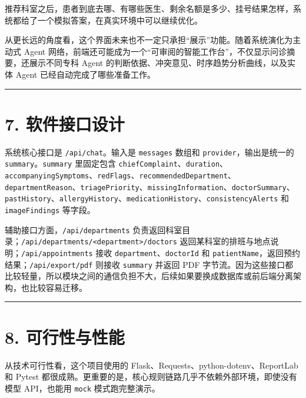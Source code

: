 \documentclass[
  chinese,
  12pt,
  UTF8,
  a4paper]{ctexart}
\begin{document}
推荐科室之后，患者到底去哪、有哪些医生、剩余名额是多少、挂号结果怎样，系统都给了一个模拟答案，在真实环境中可以继续优化。

从更长远的角度看，这个界面未来也不一定只承担``展示''功能。随着系统演化为主动式 Agent 网络，前端还可能成为一个``可审阅的智能工作台''，不仅显示问诊摘要，还展示不同专科 Agent 的判断依据、冲突意见、时序趋势分析曲线，以及实体 Agent 已经自动完成了哪些准备工作。

\begin{center}\rule{0.5\linewidth}{0.5pt}\end{center}

\section{7. 软件接口设计}\label{7-ux8f6fux4ef6ux63a5ux53e3ux8bbeux8ba1}

系统核心接口是 \texttt{/api/chat}。输入是 \texttt{messages} 数组和 \texttt{provider}，输出是统一的 \texttt{summary}。\texttt{summary} 里固定包含 \texttt{chiefComplaint}、\texttt{duration}、\texttt{accompanyingSymptoms}、\texttt{redFlags}、\texttt{recommendedDepartment}、\texttt{departmentReason}、\texttt{triagePriority}、\texttt{missingInformation}、\texttt{doctorSummary}、\texttt{pastHistory}、\texttt{allergyHistory}、\texttt{medicationHistory}、\texttt{consistencyAlerts} 和 \texttt{imageFindings} 等字段。

辅助接口方面，\texttt{/api/departments} 负责返回科室目录；\texttt{/api/departments/\textless{}department\textgreater{}/doctors} 返回某科室的排班与地点说明；\texttt{/api/appointments} 接收 \texttt{department}、\texttt{doctorId} 和 \texttt{patientName}，返回预约结果；\texttt{/api/export/pdf} 则接收 \texttt{summary} 并返回 PDF 字节流。因为这些接口都比较轻量，所以模块之间的通信负担不大，后续如果要换成数据库或前后端分离架构，也比较容易迁移。

\begin{center}\rule{0.5\linewidth}{0.5pt}\end{center}

\section{8. 可行性与性能}\label{8-ux53efux884cux6027ux4e0eux6027ux80fd}

从技术可行性看，这个项目使用的 Flask、Requests、python-dotenv、ReportLab 和 Pytest 都很成熟。更重要的是，核心规则链路几乎不依赖外部环境，即使没有模型 API，也能用 \texttt{mock} 模式跑完整演示。
\end{document}

